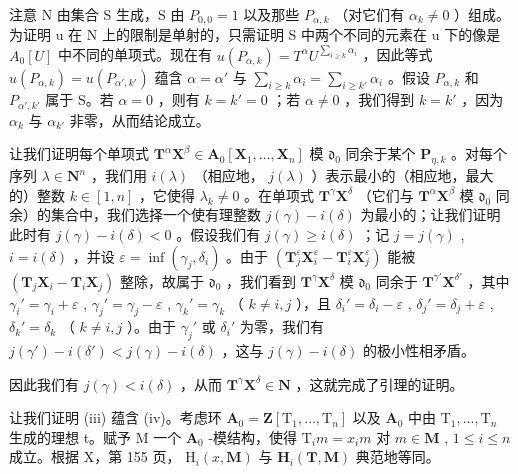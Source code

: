 注意 N 由集合 S 生成，S 由 \(P_{0,0} = 1\) 以及那些 \(P_{\alpha,k}\) （对它们有 \(\alpha_k \neq 0\) ）组成。为证明 u 在 N 上的限制是单射的，只需证明 S 中两个不同的元素在 u 下的像是 \(A_0[U]\) 中不同的单项式。现在有 \(u(P_{\alpha,k}) = T^\alpha U^{\sum_{i \geq k} \alpha_i}\) ，因此等式 \(u(P_{\alpha,k}) = u(P_{\alpha',k'})\) 蕴含 \(\alpha = \alpha'\) 与 \(\sum_{i \geq k} \alpha_i = \sum_{i \geq k'} \alpha_i\) 。假设 \(P_{\alpha,k}\) 和 \(P_{\alpha',k'}\) 属于 S。若 \(\alpha = 0\) ，则有 \(k = k' = 0\) ；若 \(\alpha \neq 0\) ，我们得到 \(k = k'\) ，因为 \(\alpha_k\) 与 \(\alpha_{k'}\) 非零，从而结论成立。

让我们证明每个单项式 \(\mathbf{T}^{\alpha}\mathbf{X}^{\beta}\in\mathbf{A}_{0}[\mathbf{X}_{1},..., \mathbf{X}_{n}]\) 模 \(\mathfrak{d}_{0}\) 同余于某个 \(\mathbf{P}_{\eta,k}\) 。对每个序列 \(\lambda\in\mathbf{N}^{n}\) ，我们用 \(i(\lambda)\) （相应地， \(j(\lambda)\) ）表示最小的（相应地，最大的）整数 \(k\in[1,n]\) ，它使得 \(\lambda_{k}\neq0\) 。在单项式 \(\mathbf{T}^{\gamma}\mathbf{X}^{\delta}\) （它们与 \(\mathbf{T}^{\alpha}\mathbf{X}^{\beta}\) 模 \(\mathfrak{d}_{0}\) 同余）的集合中，我们选择一个使有理整数 \(j(\gamma)-i(\delta)\) 为最小的；让我们证明此时有 \(j(\gamma)-i(\delta)<0\) 。假设我们有 \(j(\gamma)\geqslant i(\delta)\) ；记 \(j=j(\gamma)\) , \(i=i(\delta)\) ，并设 \(\varepsilon=\inf(\gamma_{j},\delta_{i})\) 。由于 \((\mathbf{T}_{j}^{\varepsilon}\mathbf{X}_{i}^{\varepsilon}-\mathbf{T}_{i}^{\varepsilon}\mathbf{X}_{j}^{\varepsilon})\) 能被 \((\mathbf{T}_{j}\mathbf{X}_{i}-\mathbf{T}_{i}\mathbf{X}_{j})\) 整除，故属于 \(\mathfrak{d}_{0}\) ，我们看到 \(\mathbf{T}^{\gamma}\mathbf{X}^{\delta}\) 模 \(\mathfrak{d}_{0}\) 同余于 \(\mathbf{T}^{\gamma'}\mathbf{X}^{\delta'}\) ，其中 \(\gamma_{i}'=\gamma_{i}+\varepsilon\) , \(\gamma_{j}'=\gamma_{j}-\varepsilon\) , \(\gamma_{k}'=\gamma_{k}\) （ \(k\neq i,j\) ），且 \(\delta_{i}'=\delta_{i}-\varepsilon\) , \(\delta_{j}'=\delta_{j}+\varepsilon\) , \(\delta_{k}'=\delta_{k}\) （ \(k\neq i,j\) ）。由于 \(\gamma_{j}'\) 或 \(\delta_{i}'\) 为零，我们有 \(j(\gamma')-i(\delta')<j(\gamma)-i(\delta)\) ，这与 \(j(\gamma)-i(\delta)\) 的极小性相矛盾。

因此我们有 \(j(\gamma) < i(\delta)\) ，从而 \(\mathbf{T}^{\gamma}\mathbf{X}^{\delta} \in \mathbf{N}\) ，这就完成了引理的证明。

让我们证明 (iii) 蕴含 (iv)。考虑环 \(\mathbf{A}_0 = \mathbf{Z}[\mathrm{T}_1, \ldots, \mathrm{T}_n]\) 以及 \(\mathbf{A}_0\) 中由 \(\mathrm{T}_1, \ldots, \mathrm{T}_n\) 生成的理想 t。赋予 M 一个 \(\mathbf{A}_0\) -模结构，使得 \(\mathrm{T}_i m = x_i m\) 对 \(m \in \mathbf{M}\) , \(1 \leqslant i \leqslant n\) 成立。根据 X，第 155 页， \(\mathrm{H}_i(x, \mathbf{M})\) 与 \(\mathbf{H}_i(\mathbf{T}, \mathbf{M})\) 典范地等同。

